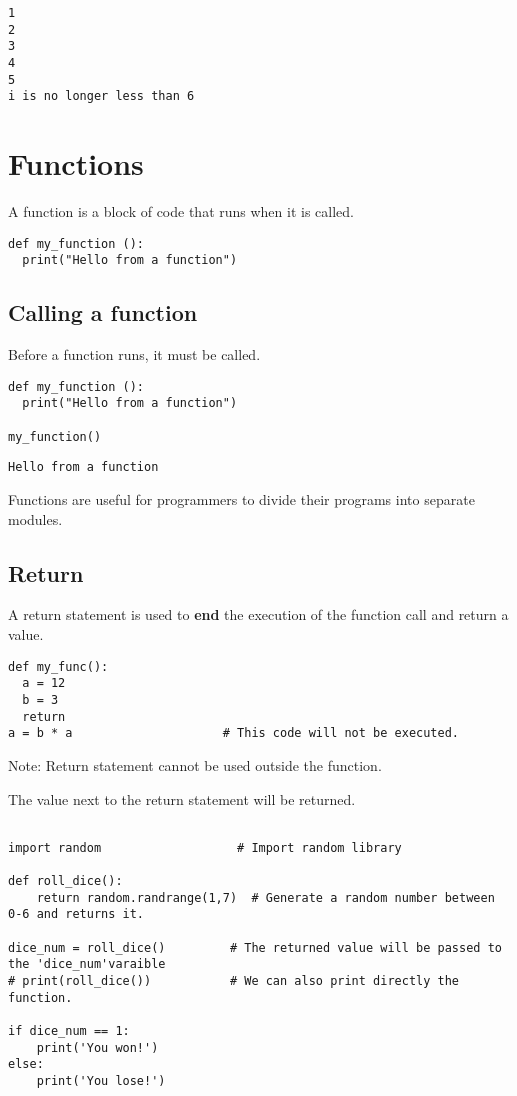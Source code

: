\documentclass[11pt]{article}
\begin{document}
\begin{verbatim}
1
2
3
4
5
i is no longer less than 6
\end{verbatim}

\section{Functions}
\label{sec:org96944b0}
A function is a block of code that runs when it is called.
\begin{verbatim}
def my_function ():
  print("Hello from a function")
\end{verbatim}

\subsection{Calling a function}
\label{sec:orgaf6eac2}
Before a function runs, it must be called.

\begin{verbatim}
def my_function ():
  print("Hello from a function")

my_function()
\end{verbatim}

\begin{verbatim}
Hello from a function
\end{verbatim}


Functions are useful for programmers to divide their programs into separate modules.


\subsection{Return}
\label{sec:org840750f}
A return statement is used to \textbf{end} the execution of the function call and return a value.

\begin{verbatim}
def my_func():
  a = 12
  b = 3
  return
a = b * a                     # This code will not be executed.

\end{verbatim}

Note: Return statement cannot be used outside the function.



The value next to the return statement will be returned.

\begin{verbatim}

import random                   # Import random library

def roll_dice():
    return random.randrange(1,7)  # Generate a random number between 0-6 and returns it.

dice_num = roll_dice()         # The returned value will be passed to the 'dice_num'varaible
# print(roll_dice())           # We can also print directly the function.

if dice_num == 1:
    print('You won!')
else:
    print('You lose!')
\end{verbatim}
\end{document}
